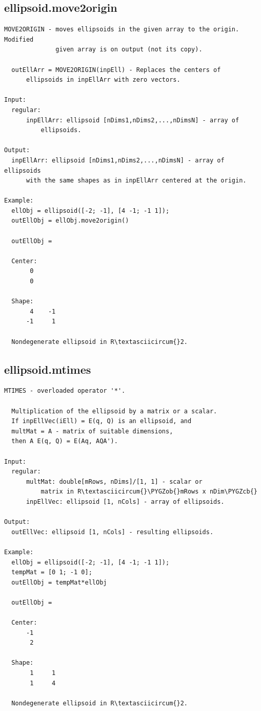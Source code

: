 \documentclass[letterpaper,10pt,english]{sphinxmanual}
\def\PYGZob{\char`\{}
\def\PYGZcb{\char`\}}
\begin{document}
\subsection{ellipsoid.move2origin}
\label{chap_functions:ellipsoid-move2origin}
\begin{Verbatim}[commandchars=\\\{\}]
MOVE2ORIGIN - moves ellipsoids in the given array to the origin. Modified
              given array is on output (not its copy).

  outEllArr = MOVE2ORIGIN(inpEll) - Replaces the centers of
      ellipsoids in inpEllArr with zero vectors.

Input:
  regular:
      inpEllArr: ellipsoid [nDims1,nDims2,...,nDimsN] - array of
          ellipsoids.

Output:
  inpEllArr: ellipsoid [nDims1,nDims2,...,nDimsN] - array of ellipsoids
      with the same shapes as in inpEllArr centered at the origin.

Example:
  ellObj = ellipsoid([-2; -1], [4 -1; -1 1]);
  outEllObj = ellObj.move2origin()

  outEllObj =

  Center:
       0
       0

  Shape:
       4    -1
      -1     1

  Nondegenerate ellipsoid in R\textasciicircum{}2.
\end{Verbatim}


\subsection{ellipsoid.mtimes}
\label{chap_functions:ellipsoid-mtimes}
\begin{Verbatim}[commandchars=\\\{\}]
MTIMES - overloaded operator '*'.

  Multiplication of the ellipsoid by a matrix or a scalar.
  If inpEllVec(iEll) = E(q, Q) is an ellipsoid, and
  multMat = A - matrix of suitable dimensions,
  then A E(q, Q) = E(Aq, AQA').

Input:
  regular:
      multMat: double[mRows, nDims]/[1, 1] - scalar or
          matrix in R\textasciicircum{}\PYGZob{}mRows x nDim\PYGZcb{}
      inpEllVec: ellipsoid [1, nCols] - array of ellipsoids.

Output:
  outEllVec: ellipsoid [1, nCols] - resulting ellipsoids.

Example:
  ellObj = ellipsoid([-2; -1], [4 -1; -1 1]);
  tempMat = [0 1; -1 0];
  outEllObj = tempMat*ellObj

  outEllObj =

  Center:
      -1
       2

  Shape:
       1     1
       1     4

  Nondegenerate ellipsoid in R\textasciicircum{}2.
\end{Verbatim}
\end{document}
